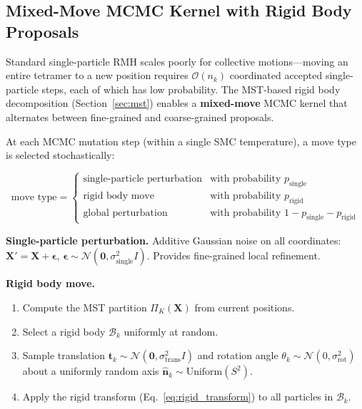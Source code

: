 \documentclass[11pt,a4paper]{article}
\newcommand{\bX}{\mathbf{X}}
\newcommand{\Normal}{\mathcal{N}}
\theoremstyle{definition}
\begin{document}
\subsection{Mixed-Move MCMC Kernel with Rigid Body Proposals}
\label{sec:smc_mixed}

Standard single-particle RMH scales poorly for collective motions---moving an entire tetramer to a new position requires $\mathcal{O}(n_k)$ coordinated accepted single-particle steps, each of which has low probability. The MST-based rigid body decomposition (Section~\ref{sec:mst}) enables a \textbf{mixed-move} MCMC kernel that alternates between fine-grained and coarse-grained proposals.

At each MCMC mutation step (within a single SMC temperature), a move type is selected stochastically:

\begin{equation}
    \text{move type} = \begin{cases}
        \text{single-particle perturbation} & \text{with probability } p_{\text{single}} \\
        \text{rigid body move} & \text{with probability } p_{\text{rigid}} \\
        \text{global perturbation} & \text{with probability } 1 - p_{\text{single}} - p_{\text{rigid}}
    \end{cases}
\end{equation}

\textbf{Single-particle perturbation.} Additive Gaussian noise on all coordinates: $\bX' = \bX + \boldsymbol{\epsilon}$, $\boldsymbol{\epsilon} \sim \Normal(\mathbf{0}, \sigma_{\text{single}}^2 I)$. Provides fine-grained local refinement.

\textbf{Rigid body move.}
\begin{enumerate}
    \item Compute the MST partition $\Pi_K(\bX)$ from current positions.
    \item Select a rigid body $\mathcal{B}_k$ uniformly at random.
    \item Sample translation $\mathbf{t}_k \sim \Normal(\mathbf{0}, \sigma_{\text{trans}}^2 I)$ and rotation angle $\theta_k \sim \Normal(0, \sigma_{\text{rot}}^2)$ about a uniformly random axis $\hat{\mathbf{n}}_k \sim \text{Uniform}(S^2)$.
    \item Apply the rigid transform (Eq.~\ref{eq:rigid_transform}) to all particles in $\mathcal{B}_k$.
\end{enumerate}
\end{document}
